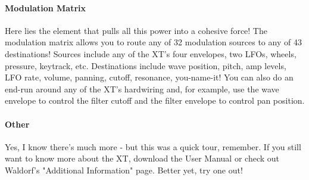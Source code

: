 \paragraph{Modulation Matrix}
Here lies the element that pulls all this power into a cohesive force! The modulation matrix allows you to route any of 32 modulation sources to any of 43 destinations! Sources include any of the XT's four envelopes, two LFOs, wheels, pressure, keytrack, etc. Destinations include wave position, pitch, amp levels, LFO rate, volume, panning, cutoff, resonance, you-name-it! You can also do an end-run around any of the XT's hardwiring and, for example, use the wave envelope to control the filter cutoff and the filter envelope to control pan position.
\paragraph{Other}
Yes, I know there's much more - but this was a quick tour, remember. If you still want to know more about the XT, download the User Manual or check out Waldorf's "Additional Information" page. Better yet, try one out! 